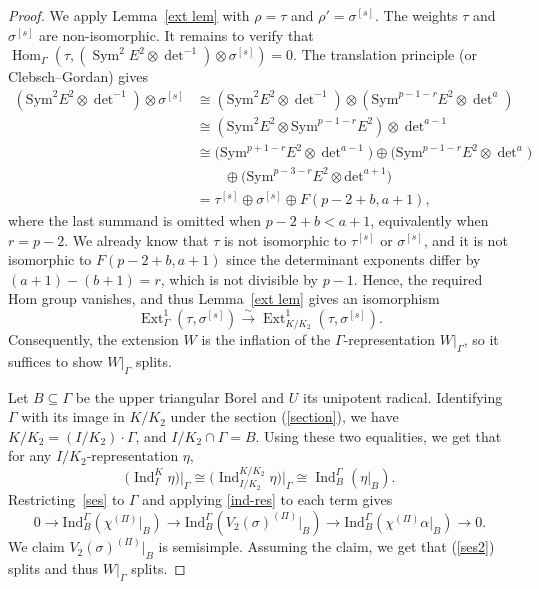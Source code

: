 \documentclass[a4paper,10pt,twoside]{amsart}
\DeclareMathOperator{\Ind}{Ind}
\DeclareMathOperator{\Ext}{Ext}
\DeclareMathOperator{\Hom}{Hom}
\DeclareMathOperator{\Sym}{Sym}
\newcommand{\Det}{\mathrm{det}}
\theoremstyle{definition}
\numberwithin{equation}{section}
\begin{document}
\begin{proof}
We apply Lemma~\ref{ext lem} with \(\rho=\tau\) and $\rho'=\sigma^{[s]}$. The weights \(\tau\) and \(\sigma^{[s]}\) are non-isomorphic. It
remains to verify that $\Hom_\Gamma\!\left(
\tau,
(\Sym^2E^2\otimes\det^{-1})\otimes\sigma^{[s]}
\right)=0.
$ The translation principle (or Clebsch--Gordan) gives
\begin{align*}
(\mathrm{Sym}^2 E^2 \otimes \det\nolimits^{-1}) \otimes \sigma^{[s]}
&\cong (\mathrm{Sym}^2 E^2 \otimes \det\nolimits^{-1})
 \otimes (\mathrm{Sym}^{p-1-r} E^2 \otimes \det\nolimits^a) \\
&\cong (\mathrm{Sym}^2 E^2 \otimes \mathrm{Sym}^{p-1-r} E^2)
 \otimes \det\nolimits^{a-1} \\
&\cong
\bigl(\mathrm{Sym}^{p+1-r} E^2 \otimes \det\nolimits^{a-1}\bigr)
\oplus
\bigl(\mathrm{Sym}^{p-1-r} E^2 \otimes \det\nolimits^{a}\bigr) \\
&\qquad{}\oplus
\bigl(\mathrm{Sym}^{p-3-r} E^2 \otimes \Det^{a+1}\bigr) \\
&=
\tau^{[s]} \oplus \sigma^{[s]} \oplus F(p-2+b,a+1),
\end{align*}
where the last summand is omitted when \(p-2+b<a+1\), equivalently when
\(r=p-2\). We already know that
\(\tau\) is not isomorphic to \(\tau^{[s]}\) or \(\sigma^{[s]}\), and it is
not isomorphic to \(F(p-2+b,a+1)\) since the determinant exponents differ by
\((a+1)-(b+1)=r\), which is not divisible by \(p-1\). Hence, the required Hom
group vanishes, and thus Lemma~\ref{ext lem} gives an isomorphism
\[
\Ext^1_\Gamma(\tau,\sigma^{[s]})
\xrightarrow{\sim}
\Ext^1_{K/K_2}(\tau,\sigma^{[s]}).
\]
Consequently, the extension $W$ is the inflation of the
$\Gamma$-representation $W|_\Gamma$, so it suffices to show $W|_\Gamma$
splits.

Let $B \subseteq \Gamma$ be the upper triangular Borel and $U$ its unipotent
radical. Identifying $\Gamma$ with its image in $K/K_2$ under the section (\ref{section}), we have $K/K_2 = (I/K_2)\cdot\Gamma$, and $I/K_2 \cap \Gamma = B$. Using these two equalities, we get that for any $I/K_2$-representation $\eta$,
\begin{equation}\label{ind-res}
\bigl(\Ind_I^K\eta\bigr)\big|_\Gamma
\cong
\bigl(\Ind_{I/K_2}^{K/K_2}\eta\bigr)\big|_\Gamma
\cong
\Ind_B^\Gamma(\eta|_B).
\end{equation}
Restricting~\eqref{ses} to $\Gamma$ and applying
\eqref{ind-res} to each term gives
\begin{equation}\label{ses2}
    0 \to \mathrm{Ind}_B^\Gamma (\chi^{(\Pi)}|_B) \to \mathrm{Ind}_B^\Gamma (V_2(\sigma)^{(\Pi)}|_B) \to \mathrm{Ind}_B^\Gamma(\chi^{(\Pi)}\alpha|_B) \to 0.
\end{equation}
We claim $V_2(\sigma)^{(\Pi)}|_B$ is semisimple. Assuming the claim, we get that (\ref{ses2}) splits and thus $W|_\Gamma$ splits.


\end{proof}
\end{document}
